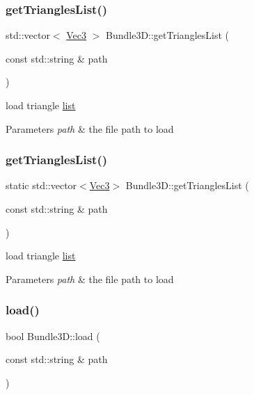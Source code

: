 \subsubsection{\texorpdfstring{get\+Triangles\+List()}{getTrianglesList()}\hspace{0.1cm}{\footnotesize\ttfamily [1/2]}}
{\footnotesize\ttfamily std\+::vector$<$ \hyperlink{classVec3}{Vec3} $>$ Bundle3\+D\+::get\+Triangles\+List (\begin{DoxyParamCaption}\item[{const std\+::string \&}]{path }\end{DoxyParamCaption})\hspace{0.3cm}{\ttfamily [static]}}

load triangle \hyperlink{protocollist-p}{list} 
\begin{DoxyParams}{Parameters}
{\em path} & the file path to load \\
\hline
\end{DoxyParams}
\mbox{\label{classBundle3D_a3e859939382cca035e3eb12425945db6}} 
\subsubsection{\texorpdfstring{get\+Triangles\+List()}{getTrianglesList()}\hspace{0.1cm}{\footnotesize\ttfamily [2/2]}}
{\footnotesize\ttfamily static std\+::vector$<$\hyperlink{classVec3}{Vec3}$>$ Bundle3\+D\+::get\+Triangles\+List (\begin{DoxyParamCaption}\item[{const std\+::string \&}]{path }\end{DoxyParamCaption})\hspace{0.3cm}{\ttfamily [static]}}

load triangle \hyperlink{protocollist-p}{list} 
\begin{DoxyParams}{Parameters}
{\em path} & the file path to load \\
\hline
\end{DoxyParams}
\mbox{\label{classBundle3D_af3cfd71d2814f21b64e8343d447528a1}} 
\subsubsection{\texorpdfstring{load()}{load()}\hspace{0.1cm}{\footnotesize\ttfamily [1/2]}}
{\footnotesize\ttfamily bool Bundle3\+D\+::load (\begin{DoxyParamCaption}\item[{const std\+::string \&}]{path }\end{DoxyParamCaption})\hspace{0.3cm}{\ttfamily [virtual]}}


